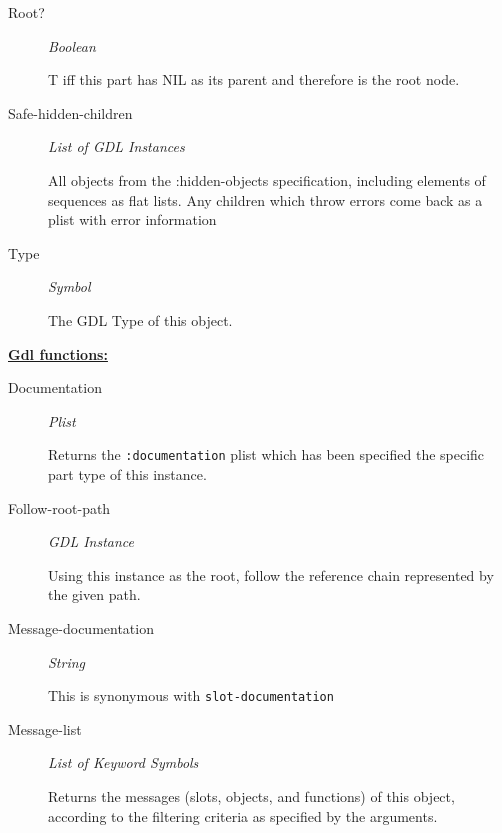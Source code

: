 \documentclass [11pt]{book}
\begin{document}
\begin{itemize}
\begin{description}
\item [Root?]
\emph{Boolean}

 T iff this part has NIL as its parent and therefore is the root node.




\item [Safe-hidden-children]
\emph{List of GDL Instances}

 All objects from the :hidden-objects specification, including elements of sequences
as flat lists. Any children which throw errors come back as a plist with error information




\item [Type]
\emph{Symbol}

 The GDL Type of this object.




\end{description}






\textbf{
\underline{Gdl functions:}}

\begin{description}

\item [Documentation]
\emph{Plist}

 Returns the \texttt{:documentation} plist which has been specified the
specific part type of this instance.




\item [Follow-root-path]
\emph{GDL Instance}

 Using this instance as the root, follow the reference chain
represented by the given path.




\item [Message-documentation]
\emph{String}

 This is synonymous with \texttt{slot-documentation}




\item [Message-list]
\emph{List of Keyword Symbols}

 Returns the messages (slots, objects, and functions) of this object, according to the filtering criteria as specified by the arguments.





\end{description}
\end{itemize}
\end{document}
